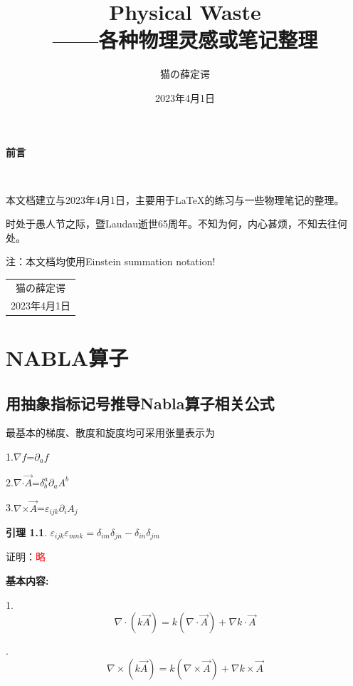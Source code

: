 \documentclass[a4paper,12pt,oneside]{ctexbook}
\title{{{\Huge{\textbf{Physical Waste}}}}\\——各种物理灵感或笔记整理}%
\author{猫の薛定谔}
\date{2023年4月1日}
\newtheorem{lemma}[theorem]{引理}
\renewenvironment{proof}{{\it 证明：}\quad}
{\hfill \par}
\begin{document}
	\maketitle
	\setcounter{page}{1}

	\begin{center}
		\Huge\textbf{前言}
	\end{center}~\

  本文档建立与2023年4月1日，主要用于LaTeX的练习与一些物理笔记的整理。\par 
  时处于愚人节之际，暨Laudau逝世65周年。不知为何，内心甚烦，不知去往何处。\par 
  注：本文档均使用Einstein summation notation!
  \begin{flushright}
  	\begin{tabular}{c}
  		猫の薛定谔\\
  		2023年4月1日
  	\end{tabular}
  \end{flushright}


\newpage
{}
\setcounter{page}{1}
\tableofcontents
\newpage
\setcounter{page}{1}

\chapter{NABLA算子}
\section{用抽象指标记号推导Nabla算子相关公式}
最基本的梯度、散度和旋度均可采用张量表示为\par 
1.$\nabla$$f$=$\partial_a$$f$\par 
2.$\nabla$$\cdot$$\vec{A}$=$\delta_b^a$$\partial_a$$A^b$\par 
3.$\nabla$$\times$$\vec{A}$=$\varepsilon_{ijk}$$\partial_i$$A_j$\par 
\begin{lemma}
	$\varepsilon_{ijk}\varepsilon_{mnk}=\delta_{im}\delta_{jn}-\delta_{in}\delta_{jm}$ 
\end{lemma}
\par 
证明：\textcolor{red}{略}\par 
\textbf{基本内容:}\par
1. $$
\nabla\cdot\left(k\vec{A}\right)=k(\nabla\cdot\vec{A})+\nabla k\cdot\vec{A} 
$$\par 
\begin{proof}
{\color{red}{L.H.S=$\delta_b^a$$\partial_a$$kA_b$=k$\partial_a$$A^a$+$\partial_a$$k$$A^a$=R.H.S}}
\end{proof}
2.$$
\nabla\times(k\vec{A})=k(\nabla\times\vec{A})+\nabla k\times\vec{A} 
$$\par 
\begin{proof}
{}
\end{proof}
\end{document}
